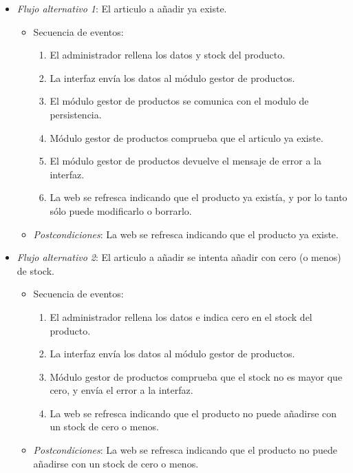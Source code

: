 \begin{enumerate}[{\bf UC-1}]
\begin{itemize}
  \item {\it Flujo alternativo 1}: El articulo a añadir ya existe.
\begin{itemize}
\item Secuencia de eventos:

    \begin{enumerate}[1. ]
    \item El administrador rellena los datos y stock del producto.
    \item La interfaz envía los datos al módulo gestor de productos.
    \item El módulo gestor de productos se comunica con el modulo de persistencia.
    \item Módulo gestor de productos comprueba que el articulo ya existe.
    \item El módulo gestor de productos devuelve el mensaje de error a la interfaz.
    \item La web se refresca indicando que el producto ya existía, y por lo tanto sólo puede modificarlo  o borrarlo.

    \end{enumerate}
    \item {\it Postcondiciones}: La web se refresca indicando que el producto ya existe.
\end{itemize}


  \item {\it Flujo alternativo 2}: El articulo a añadir se intenta añadir con cero (o menos) de stock.
\begin{itemize}
\item Secuencia de eventos:

    \begin{enumerate}[1. ]
    \item El administrador rellena los datos e indica cero en el stock del producto.
    \item La interfaz envía los datos al módulo gestor de productos.
    \item Módulo gestor de productos comprueba que el stock no es mayor que cero, y envía el error a la interfaz.
    \item La web se refresca indicando que el producto no puede añadirse con un stock de cero o menos.


    \end{enumerate}
    \item {\it Postcondiciones}: La web se refresca indicando que el producto no puede añadirse con un stock de cero o menos.
\end{itemize}


\end{itemize}
\end{enumerate}
